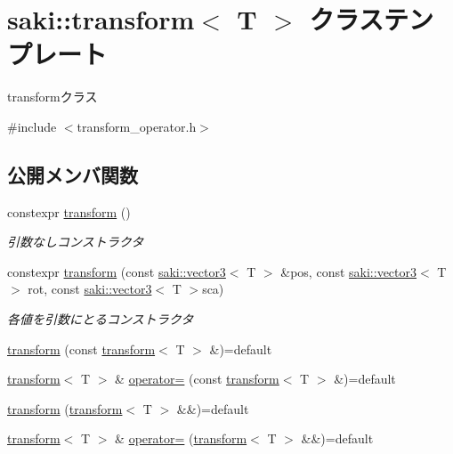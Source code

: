 \hypertarget{classsaki_1_1transform}{}\section{saki\+:\+:transform$<$ T $>$ クラステンプレート}
\label{classsaki_1_1transform}


transformクラス  




{\ttfamily \#include $<$transform\+\_\+operator.\+h$>$}

\subsection*{公開メンバ関数}
\begin{DoxyCompactItemize}
\item 
constexpr \mbox{\hyperlink{classsaki_1_1transform_a6d3d745d729424d11a67514dcbedfc4b}{transform}} ()
\begin{DoxyCompactList}\small\item\em 引数なしコンストラクタ \end{DoxyCompactList}\item 
constexpr \mbox{\hyperlink{classsaki_1_1transform_ae508c65cf86017bc6deae19eda294dbf}{transform}} (const \mbox{\hyperlink{classsaki_1_1vector3}{saki\+::vector3}}$<$ T $>$ \&pos, const \mbox{\hyperlink{classsaki_1_1vector3}{saki\+::vector3}}$<$ T $>$ rot, const \mbox{\hyperlink{classsaki_1_1vector3}{saki\+::vector3}}$<$ T $>$sca)
\begin{DoxyCompactList}\small\item\em 各値を引数にとるコンストラクタ \end{DoxyCompactList}\item 
\mbox{\hyperlink{classsaki_1_1transform_a973773964975d30d4f4a114ebb94d5ef}{transform}} (const \mbox{\hyperlink{classsaki_1_1transform}{transform}}$<$ T $>$ \&)=default
\item 
\mbox{\hyperlink{classsaki_1_1transform}{transform}}$<$ T $>$ \& \mbox{\hyperlink{classsaki_1_1transform_a02ae1743b6a54bc004b69b5b9ec3e574}{operator=}} (const \mbox{\hyperlink{classsaki_1_1transform}{transform}}$<$ T $>$ \&)=default
\item 
\mbox{\hyperlink{classsaki_1_1transform_a570e4f075582d4c50376f1170bce7af2}{transform}} (\mbox{\hyperlink{classsaki_1_1transform}{transform}}$<$ T $>$ \&\&)=default
\item 
\mbox{\hyperlink{classsaki_1_1transform}{transform}}$<$ T $>$ \& \mbox{\hyperlink{classsaki_1_1transform_aa43de25eaecdc6d713f83998247e9736}{operator=}} (\mbox{\hyperlink{classsaki_1_1transform}{transform}}$<$ T $>$ \&\&)=default

\end{DoxyCompactItemize}
